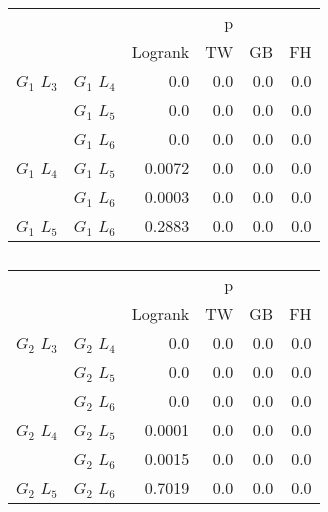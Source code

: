      \begin{table}
        \centering
        \begin{tabular}{llrrrr}
          \toprule
                       &             &         &  p &    &     \\
          \cmidrule{3-6}
                       &             & Logrank & TW & GB & FH  \\
          \midrule
          $G_1$ $L_3$  & $G_1$ $L_4$  &  0.0 &  0.0 &  0.0 &  0.0     \\
                       & $G_1$ $L_5$  & 0.0 & 0.0 & 0.0 & 0.0    \\
                       & $G_1$ $L_6$  & 0.0 & 0.0 & 0.0 & 0.0      \\
          $G_1$ $L_4$  & $G_1$ $L_5$  & 0.0072 & 0.0 & 0.0 & 0.0      \\
                       & $G_1$ $L_6$  & 0.0003 & 0.0 & 0.0 & 0.0       \\
          $G_1$ $L_5$   & $G_1$ $L_6$ & 0.2883 &  0.0 & 0.0 & 0.0      \\
          \bottomrule
        \end{tabular}
        \label{tab:g1_ingroup_tests_disp}
        \caption{}
      \end{table}


      \begin{table}
        \centering
        \begin{tabular}{llrrrr}
          \toprule
                       &             &         &  p &    &     \\
          \cmidrule{3-6}
                       &             & Logrank & TW & GB & FH  \\
          \midrule
          $G_2$ $L_3$  & $G_2$ $L_4$  &  0.0 &  0.0 &  0.0 &  0.0     \\
                       & $G_2$ $L_5$  & 0.0 & 0.0 & 0.0 & 0.0    \\
                       & $G_2$ $L_6$  & 0.0 & 0.0 & 0.0 & 0.0      \\
          $G_2$ $L_4$  & $G_2$ $L_5$  & 0.0001 & 0.0 & 0.0 & 0.0      \\
                       & $G_2$ $L_6$  & 0.0015 & 0.0 & 0.0 & 0.0       \\
          $G_2$ $L_5$   & $G_2$ $L_6$ & 0.7019 &  0.0 & 0.0 & 0.0      \\
          \bottomrule
        \end{tabular}
        \label{tab:g2_ingroup_tests_disp}
        \caption{}
      \end{table}




